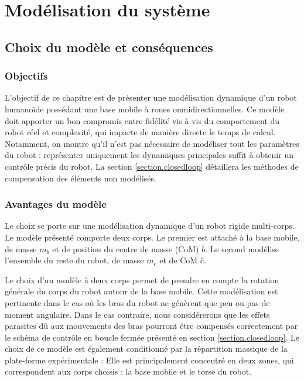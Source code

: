 \chapter{Modélisation du système}
\section{Choix du modèle et conséquences}
	\subsection{Objectifs}
		L'objectif de ce chapitre est de présenter une modélisation dynamique d'un robot humanoïde possédant une base mobile à roues omnidirectionnelles. 
		Ce modèle doit apporter un bon compromis entre fidélité vis à vis du comportement du robot réel et complexité, qui impacte de manière directe le temps de calcul.
		Notamment, on montre qu'il n'est pas nécessaire de modéliser tout les paramètres du robot : représenter uniquement les dynamiques principales suffit à obtenir un contrôle précis du robot. 
		La section \ref{section.closedloop} détaillera les méthodes de compensation des éléments non modélisés.
	
		
	\subsection{Avantages du modèle}
		
		Le choix se porte sur une modélisation dynamique d'un robot rigide multi-corps. 
		Le modèle présenté  comporte deux corps. Le premier est attaché à la base mobile, de masse $m_b$ et de position du centre de masse (CoM) $\bar{b}$.
		Le second modélise l'ensemble du reste du robot, de masse $m_c$ et de CoM $\bar{c}$.
		
		Le choix d'un modèle à deux corps permet de prendre en compte la rotation générale du corps du robot autour de la base mobile.
		Cette modélisation est pertinente dans le cas où les bras du robot ne génèrent que peu ou pas de moment angulaire.
		Dans le cas contraire, nous considérerons que les effets parasites dû aux mouvements des bras pourront être compensés correctement par le schéma de contrôle en boucle fermée présenté en section \ref{section.closedloop}.
		Le choix de ce modèle est également conditionné par la répartition massique de la plate-forme expérimentale :
		Elle est principalement concentré en deux zones, qui correspondent aux corps choisis : la base mobile et le torse du robot.	
	
